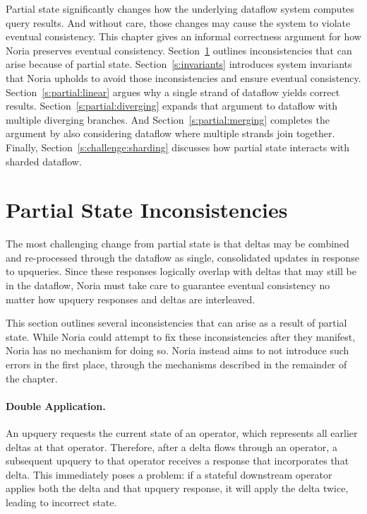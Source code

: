 Partial state significantly changes how the underlying dataflow system computes
query results. And without care, those changes may cause the system to violate
eventual consistency. This chapter gives an informal correctness argument for
how Noria preserves eventual consistency.
Section~\ref{s:partial:inconsistencies} outlines inconsistencies that can arise
because of partial state. Section~\ref{s:invariants} introduces system
invariants that Noria upholds to avoid those inconsistencies and ensure eventual
consistency. Section~\ref{s:partial:linear} argues why a single strand of
dataflow yields correct results. Section~\ref{s:partial:diverging} expands that
argument to dataflow with multiple diverging branches. And
Section~\ref{s:partial:merging} completes the argument by also considering
dataflow where multiple strands join together. Finally,
Section~\ref{s:challenge:sharding} discusses how partial state interacts with
sharded dataflow.

\section{Partial State Inconsistencies}
\label{s:partial:inconsistencies}

The most challenging change from partial state is that deltas may be combined
and re-processed through the dataflow as single, consolidated updates in
response to upqueries. Since these responses logically overlap with deltas that
may still be in the dataflow, Noria must take care to guarantee eventual
consistency no matter how upquery responses and deltas are interleaved.

This section outlines several inconsistencies that can arise as a result of
partial state. While Noria could attempt to fix these inconsistencies after they
manifest, Noria has no mechanism for doing so. Noria instead aims to not
introduce such errors in the first place, through the mechanisms described in
the remainder of the chapter.

\paragraph{Double Application.}
An upquery requests the current state of an operator, which represents all
earlier deltas at that operator. Therefore, after a delta flows through an
operator, a subsequent upquery to that operator receives a response that
incorporates that delta. This immediately poses a problem: if a stateful
downstream operator applies both the delta and that upquery response, it will
apply the delta twice, leading to incorrect state.

